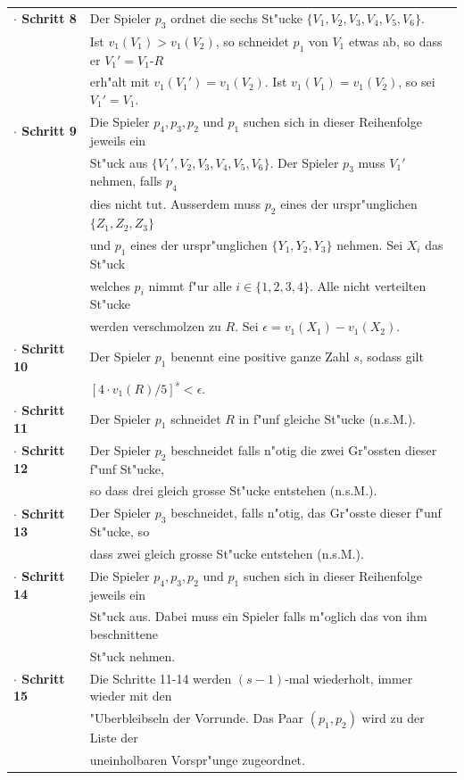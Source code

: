 \documentclass[11pt, a4paper, twoside]{article}
\numberwithin{equation}{section}
\begin{document}
\begin{tabular}{|ll|}
\hline
\textbf{$\cdot$ Schritt 8}&Der Spieler $p_3$ ordnet die sechs St"ucke $\{V_1,V_2,V_3,V_4,V_5,V_6\}$.\\&Ist $v_1(V_1)>v_1(V_2)$, so schneidet $p_1$ von $V_1$ etwas ab, so dass er $V_1'=V_1$-$R$\\&erh"alt mit $v_1(V_1')=v_1(V_2)$. Ist $v_1(V_1)=v_1(V_2)$, so sei  $V_1'=V_1$.\\
\textbf{$\cdot$ Schritt 9}&Die Spieler $p_4,p_3,p_2$ und $p_1$ suchen sich in dieser Reihenfolge jeweils ein\\&St"uck aus $\{V_1',V_2,V_3,V_4,V_5,V_6\}$. Der Spieler $p_3$ muss $V_1'$ nehmen, falls $p_4$\\&dies nicht tut. Ausserdem muss $p_2$ eines der urspr"unglichen $\{Z_1,Z_2,Z_3\}$\\&und $p_1$ eines der urspr"unglichen $\{Y_1,Y_2,Y_3\}$ nehmen. Sei $X_i$ das St"uck\\&welches $p_i$ nimmt f"ur alle $i \in \{1,2,3,4\}$. Alle nicht verteilten St"ucke\\&werden verschmolzen zu $R$. Sei $\epsilon=v_1(X_1)-v_1(X_2)$.\\
\textbf{$\cdot$ Schritt 10}&Der Spieler $p_1$ benennt eine positive ganze Zahl $s$, sodass gilt\\&$[4\cdot v_1(R)/5]^s<\epsilon$.\\
\textbf{$\cdot$ Schritt 11}&Der Spieler $p_1$ schneidet $R$ in f"unf gleiche St"ucke (n.s.M.).\\
\textbf{$\cdot$ Schritt 12}&Der Spieler $p_2$ beschneidet falls n"otig die zwei Gr"ossten dieser f"unf  St"ucke,\\&so dass drei gleich grosse St"ucke entstehen (n.s.M.).\\
\textbf{$\cdot$ Schritt 13}&Der Spieler $p_3$ beschneidet, falls n"otig, das Gr"osste dieser f"unf St"ucke, so\\&dass zwei gleich grosse St"ucke entstehen (n.s.M.).\\
\textbf{$\cdot$ Schritt 14}&Die Spieler $p_4,p_3,p_2$ und $p_1$ suchen sich in dieser Reihenfolge jeweils ein\\&St"uck aus. Dabei muss ein Spieler falls m"oglich das von ihm beschnittene\\&St"uck nehmen.\\
\textbf{$\cdot$ Schritt 15}&Die Schritte 11-14 werden $(s-1)$-mal wiederholt, immer wieder mit den\\&"Uberbleibseln der Vorrunde. Das Paar $(p_1,p_2)$ wird zu der Liste der\\&uneinholbaren Vorspr"unge zugeordnet.\\

\end{tabular}
\end{document}
